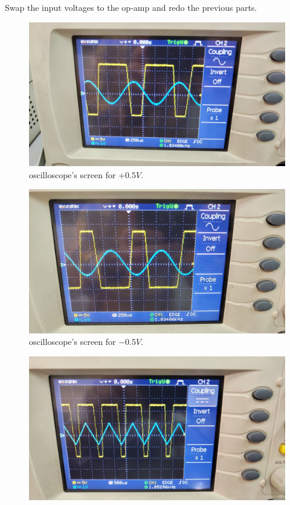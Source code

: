 \documentclass[11pt]{article}
\newcommand{\PicScale}{0.2}
\begin{document}
\begin{question}
\begin{subquestion}{Swap the input voltages to the op-amp and redo the previous parts.}
{\begin{figure}[H]
                    \includegraphics[scale=\PicScale,angle=0]{Fig/12.jpeg}
                    \caption{oscilloscope's screen for $+0.5V$.}
                \end{figure}
                \begin{figure}[H]
                    \centering
                    \includegraphics[scale=\PicScale,angle=0]{Fig/13.jpeg}
                    \caption{oscilloscope's screen for $-0.5V$.}
                \end{figure}
                \begin{figure}[H]
                    \centering
                    \includegraphics[scale=\PicScale,angle=0]{Fig/53.jpeg}

\end{figure}}
\end{subquestion}
\end{question}
\end{document}
